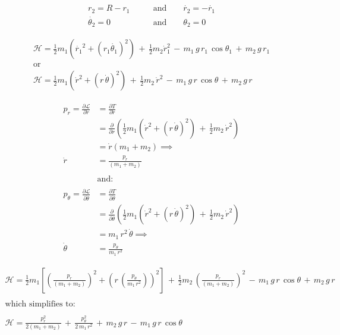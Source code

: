 \documentclass{article}
\begin{document}
\begin{align*}
r_{2} = R - r_{1} \qquad&\text{and}\qquad \dot{r_{2}} = -\dot{r_{1}} \\
\dot{\theta_{2}} = 0 \qquad&\text{and}\qquad \theta_{2} = 0
\end{align*}

\begin{gather*}
\mathscr{H} = \frac{1}{2}m_{1}\left( \dot{r_{1}}^{2} + (r_{1}\dot{\theta_{1}})^{2} \right) \,+\, \frac{1}{2}m_{2}\dot{r}_{1}^{2} \,-\, m_{1}\,g\,r_{1}\,\cos{\theta_{1}} \,+\, m_{2}\,g\,r_{1} \\
\text{or} \\
\mathscr{H} = \frac{1}{2}m_{1}\left( \dot{r}^{2} + (r\,\dot{\theta})^{2} \right) \,+\, \frac{1}{2}m_{2}\,\dot{r}^{2} \,-\, m_{1}\,g\,r\,\cos{\theta} \,+\, m_{2}\,g\,r
\end{gather*}

\begin{align*}
p_{r} = \frac{\partial \mathscr{L}}{\partial \dot{r}} &= \frac{\partial T}{\partial \dot{r}} \\
&= \frac{\partial}{\partial \dot{r}} \left( \frac{1}{2}m_{1}\left( \dot{r}^{2} + (r\,\dot{\theta})^{2} \right) \,+\, \frac{1}{2}m_{2}\,\dot{r}^{2} \right) \\
&= \dot{r}(m_{1} +m_{2}) \implies \\
\dot{r} &= \frac{p_{r}}{(m_{1}+m_{2})} \\
\\
&\text{and:} \\
\\
p_{\theta} = \frac{\partial \mathscr{L}}{\partial \dot{\theta}} &= \frac{\partial T}{\partial \dot{\theta}} \\
&= \frac{\partial}{\partial \dot{\theta}}\left( \frac{1}{2}m_{1}\left( \dot{r}^{2} + (r\,\dot{\theta})^{2} \right) \,+\, \frac{1}{2}m_{2}\,\dot{r}^{2} \right) \\
&= m_{1} \, r^{2} \, \dot{\theta} \implies \\
\dot{\theta} &= \frac{p_{\theta}}{m_{1}\,r^{2}}
\end{align*}

\begin{gather*}
\mathscr{H} = \frac{1}{2}m_{1}\left[ \left(\frac{p_{r}}{(m_{1}+m_{2})}\right)^{2} + \left(r\,\left(\frac{p_{\theta}}{m_{1}\,r^{2}}\right)\right)^{2} \right] \,+\, \frac{1}{2}m_{2}\,\left(\frac{p_{r}}{(m_{1}+m_{2})}\right)^{2} \,-\, m_{1}\,g\,r\,\cos{\theta} \,+\, m_{2}\,g\,r \\
\\
\text{which simplifies to:} \\
\\
\mathscr{H} = \frac{p_{r}^{2}}{2(m_{1}+m_{2})} \,+\, \frac{p_{\theta}^{2}}{2\,m_{1}\,r^{2}} \,+\, m_{2}\,g\,r \,-\, m_{1}\,g\,r\,\cos{\theta}
\end{gather*}
\end{document}
